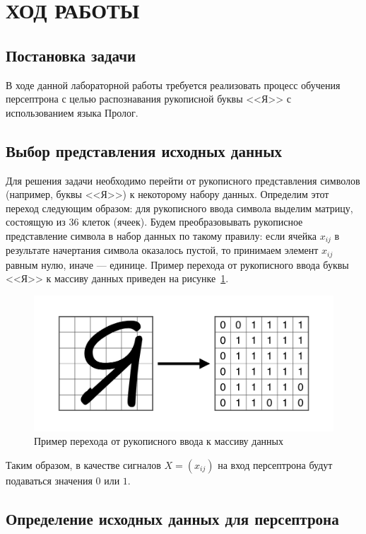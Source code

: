 \section{ХОД РАБОТЫ}

\subsection{Постановка задачи}

В ходе данной лабораторной работы требуется реализовать процесс обучения
персептрона с целью распознавания рукописной буквы <<Я>> с использованием языка Пролог.

\subsection{Выбор представления исходных данных}

Для решения задачи необходимо перейти от рукописного
представления символов (например, буквы <<Я>>) к некоторому набору данных.
Определим этот переход следующим образом: для рукописного ввода символа
выделим матрицу, состоящую из $36$ клеток (ячеек).
Будем преобразовывать рукописное представление символа в набор данных по такому
правилу: если ячейка $x_{ij}$ в результате начертания символа оказалось пустой,
то принимаем элемент $x_{ij}$ равным нулю, иначе --- единице.
Пример перехода от рукописного ввода буквы <<Я>> к массиву
данных приведен на рисунке~\ref{fig:symbol_to_matrix}.
\begin{figure}[h!]
  \centering
  \includegraphics[width=150mm]{img/symbol_to_matrix}
  \caption{Пример перехода от рукописного ввода к массиву данных}
  \label{fig:symbol_to_matrix}
\end{figure}

Таким образом, в качестве сигналов $X =( x_{ij} )$ на вход персептрона
будут подаваться значения $0$ или $1$.


\subsection{Определение исходных данных для персептрона}

